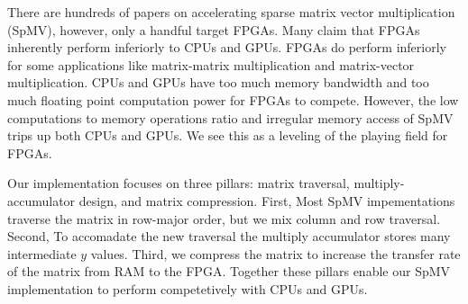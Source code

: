 
There are hundreds of papers on accelerating sparse matrix vector multiplication (SpMV), however, only a handful target FPGAs. Many claim that FPGAs inherently perform inferiorly to CPUs and GPUs. FPGAs do perform inferiorly for some applications like matrix-matrix multiplication and matrix-vector multiplication. CPUs and GPUs have too much memory bandwidth and too much floating point computation power for FPGAs to compete. However, the low computations to memory operations ratio and irregular memory access of SpMV trips up both CPUs and GPUs. We see this as a leveling of the playing field for FPGAs.

Our implementation focuses on three pillars: matrix traversal, multiply-accumulator design, and matrix compression. First, Most SpMV impementations traverse the matrix in row-major order, but we mix column and row traversal. Second, To accomadate the new traversal the multiply accumulator stores many intermediate $y$ values. Third, we compress the matrix to increase the transfer rate of the matrix from RAM to the FPGA. Together these pillars enable our SpMV implementation to perform competetively with CPUs and GPUs.


